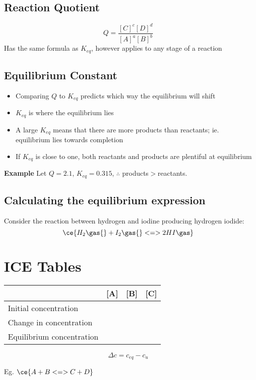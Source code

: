 	\subsection{Reaction Quotient}
		$$Q=\frac{[C]^{c}[D]^{d}}{[A]^a[B]^b}$$
		Has the same formula as $K_{eq}$, however applies to any stage of a reaction
		
	\subsection{Equilibrium Constant}
		\begin{itemize}
			\item Comparing $Q$ to $K_{eq}$ predicts which way the equilibrium will shift
			\item $K_{eq}$ is where the equilibrium lies
			\item A large $K_{eq}$ means that there are more products than reactants; ie. equilibrium lies towards completion
			\item If $K_{eq}$ is close to one, both reactants and products are plentiful at equilibrium
		\end{itemize}
		\textbf{Example} Let $Q=2.1$, $K_{eq}=0.315$, $\therefore$ products$>$reactants.

	\subsection{Calculating the equilibrium expression}
		Consider the reaction between hydrogen and iodine producing hydrogen iodide:
		$$\ce{H_{2}\gas{} + I_{2}\gas{} <=> 2HI\gas}$$

\section{ICE Tables} \label{6/11/2024}
	\begin{table}[htbp]
		\centering
		\begin{tabular}{|l|l|l|l|}
			\hline
			 & [A] & [B] & [C] \\ \hline
			Initial concentration &  &  &  \\
			Change in concentration &  &  &  \\
			Equilibrium concentration &  &  &  \\ \hline
		\end{tabular}
	\end{table}

	$$\Delta c = c_{eq}- c_{u}$$

	Eg. $\ce{A + B <=> C + D}$

